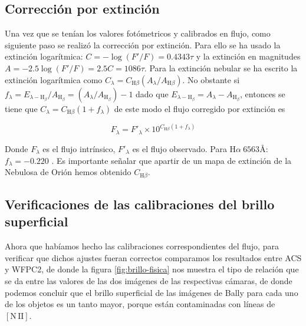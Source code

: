\documentclass{article}
\newcommand\ha{\ensuremath{\mathrm{H}\alpha}}
\newcommand\nii{\ensuremath{\mathrm{[N\,II]}}}
\begin{document}
\subsection{Corrección por extinción}
\label{sec:extintion}

Una vez que se tenían los valores fotómetricos y calibrados en flujo, como siguiente paso se  realizó la corrección por extinción. Para ello se ha usado la extinción logarítmica: \(C = -\log(F'/F) = 0.4343\tau\) y  la extinción en magnitudes \(A=-2.5\log(F'/F)=2.5C=1086\tau\). Para la extinción nebular se ha escrito la extinción logarítmica como  \(C_{\lambda} = C_{\text{H}\beta}(A_{\lambda}/A_{\text{H}\beta})\). No obstante si  \(f_{\lambda}= E_{\lambda-\text{H}_{\beta}}/A_{\text{H}_{\beta}}=(A_{\lambda}/A_{\text{H}_{\beta}})-1\)  dado que \(E_{\lambda-\text{H}_{\beta}}=A_{\lambda}-A_{\text{H}_{\beta}}\), entonces se tiene que \(C_{\lambda}= C_{\text{H}\beta}(1+f_{\lambda})\)  de este modo  el flujo corregido por extinción es

\begin{equation}
  \label{eq:flujo}
  F_{\lambda} = F'_{\lambda}\times10^{C_{\text{H}\beta}(1+f_{\lambda})}
\end{equation}

 Donde  \(F_{\lambda}\) es el flujo intrínsico, \(F'_{\lambda}\) es el flujo observado. Para \(\ha\ 6563\text{\AA{}}\): \(f_{\lambda} = -0.220\) \citep{Blagrave:2007}. Es importante señalar que  apartir de un mapa de extinción de la Nebulosa de Orión hemos obtenido \(C_{\text{H}\beta}\).

\subsection{Verificaciones de las calibraciones del brillo superficial}
\label{sec:verificaciones}

Ahora que habíamos hecho las calibraciones correspondientes del flujo, para verificar que dichos ajustes fueran correctos comparamos los resultados entre ACS y WFPC2, de donde la figura \ref{fig:brillo-fisica} nos muestra el tipo de relación que se da entre las valores de las dos imágenes de las respectivas cámaras, de donde podemos concluir que el brillo superficial de las imágenes de Bally para cada uno de los objetos es un tanto mayor, porque están contaminadas con líneas de \(\nii{}\).\\
\end{document}
